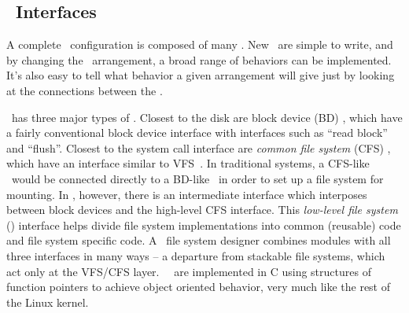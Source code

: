 \subsection {\Module\ Interfaces}
\label{sec:design:interfaces}

A complete \Kudos\ configuration is composed of many \modules. 
New \modules\ are simple to write, and
by
changing the \module\ arrangement, a broad range of behaviors can be
implemented.
%
It's also easy to tell what behavior a given arrangement will
give just by looking at the connections between the \modules.

\Kudos\ has three major types of \modules.
%
Closest to the disk are block device
(BD) \modules, which have a fairly conventional block device
interface with interfaces such as ``read block'' and ``flush''. 
%
Closest to the system call interface are
\emph{common file system} (CFS) \modules, which have an interface similar to
VFS~\cite{kleiman86vnodes}. 
%
In traditional systems, a CFS-like \module\ would be
connected directly to a BD-like \module\ in order to set up a file system for
mounting.
%
In \Kudos, however, there is an intermediate interface which interposes
between block devices and the high-level CFS interface.
%
This \emph{low-level file system} (\LFS) interface helps divide
file system implementations into common (reusable) code and file system
specific code. A \Kudos\ file system designer combines modules with all
three interfaces in many ways -- a departure from stackable file systems,
which act only at the VFS/CFS layer. \Kudos\ \modules\ are implemented in C
using structures of function pointers to achieve object oriented behavior,
very much like the rest of the Linux kernel.

